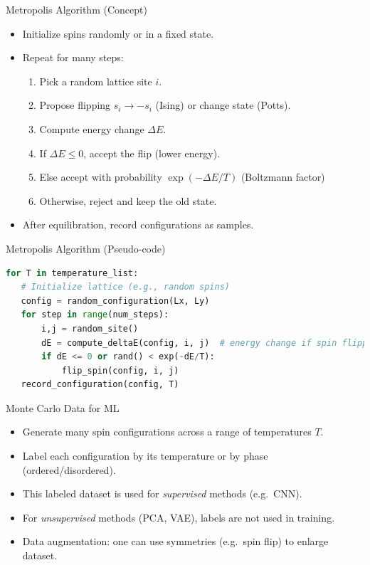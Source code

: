 \documentclass{beamer}
\begin{document}
\begin{frame}{Metropolis Algorithm (Concept)}
 \begin{itemize}
   \item Initialize spins randomly or in a fixed state.
   \item Repeat for many steps:
     \begin{enumerate}
       \item Pick a random lattice site $i$.
       \item Propose flipping $s_i \to -s_i$ (Ising) or change state (Potts).
       \item Compute energy change $\Delta E$.
       \item If $\Delta E \le 0$, accept the flip (lower energy).
       \item Else accept with probability $\exp(-\Delta E/T)$ (Boltzmann factor) 
       \item Otherwise, reject and keep the old state.
     \end{enumerate}
   \item After equilibration, record configurations as samples.
 \end{itemize}
\end{frame}

\begin{frame}[fragile]{Metropolis Algorithm (Pseudo-code)}
 \begin{lstlisting}[language=Python]
for T in temperature_list:
   # Initialize lattice (e.g., random spins)
   config = random_configuration(Lx, Ly)
   for step in range(num_steps):
       i,j = random_site()
       dE = compute_deltaE(config, i, j)  # energy change if spin flipped
       if dE <= 0 or rand() < exp(-dE/T):
           flip_spin(config, i, j)
   record_configuration(config, T)
 \end{lstlisting}
\end{frame}

\begin{frame}{Monte Carlo Data for ML}
 \begin{itemize}
   \item Generate many spin configurations across a range of temperatures $T$.
   \item Label each configuration by its temperature or by phase (ordered/disordered).
   \item This labeled dataset is used for \emph{supervised} methods (e.g.\ CNN).
   \item For \emph{unsupervised} methods (PCA, VAE), labels are not used in training.
   \item Data augmentation: one can use symmetries (e.g.\ spin flip) to enlarge dataset.
 \end{itemize}
\end{frame}
\end{document}
